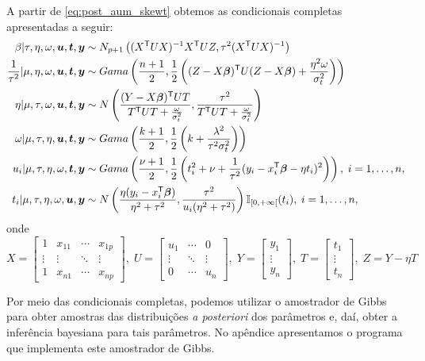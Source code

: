 A partir de \eqref{eq:post_aum_skewt} obtemos as condicionais completas apresentadas a seguir:
\begin{align}
\beta|\tau,\eta,\omega,{\boldsymbol{u}},{\boldsymbol{t}},{\boldsymbol{y}} & \sim N_{p+1}\left((X^{\mathsf{T}} UX)^{-1}X^{\mathsf{T}} UZ,\tau^2(X^{\mathsf{T}} UX)^{-1}\right) \notag \\
\frac{1}{\tau^2}|\mu,\eta,\omega,{\boldsymbol{u}},{\boldsymbol{t}},{\boldsymbol{y}} & \sim Gama\left(\frac{n+1}{2},\frac{1}{2}\left((Z-X{\boldsymbol{\beta}})^{\mathsf{T}} U(Z-X{\boldsymbol{\beta}})+\frac{\eta^2\omega}{\sigma_t^2}\right)\right) \notag \\
\eta|\mu,\tau,\omega,{\boldsymbol{u}},{\boldsymbol{t}},{\boldsymbol{y}} & \sim N\left(\frac{(Y-X{\boldsymbol{\beta}})^{\mathsf{T}} UT}{T^{\mathsf{T}} UT+\tfrac{\omega}{\sigma_t^2}},\frac{\tau^2}{T^{\mathsf{T}} UT+\tfrac{\omega}{\sigma_t^2}}\right) \notag  \\
\omega|\mu,\tau,\eta,{\boldsymbol{u}},{\boldsymbol{t}},{\boldsymbol{y}} & \sim Gama\left(\frac{k+1}{2},\frac{1}{2}\left(k+\frac{\lambda^2}{\tau^2\sigma_t^2}\right)\right) \notag \\
u_i|\mu,\tau,\eta,\omega,{\boldsymbol{t}},{\boldsymbol{y}} & \sim Gama\left(\frac{\nu+1}{2},\frac{1}{2}\left(t_i^2+\nu+\frac{1}{\tau^2}(y_i-x_i^{\mathsf{T}}{\boldsymbol{\beta}}-\eta t_i)^2\right)\right), \;i=1,\ldots,n \notag ,\\
t_i|\mu,\tau,\eta,\omega,{\boldsymbol{u}},{\boldsymbol{y}} & \sim N\left(\frac{\eta(y_i-x_i^{\mathsf{T}}{\boldsymbol{\beta}})}{\eta^2+\tau^2},\frac{\tau^2}{u_i(\eta^2+\tau^2)}\right)\mathbb{I}_{[0,+\infty[}(t_i),\; i=1,\ldots,n,
\end{align}
onde
\begin{equation}
X=\begin{bmatrix}
1 & x_{11} & \cdots & x_{1p} \\
\vdots & \vdots & \ddots & \vdots \\
1 & x_{n1} & \cdots & x_{np}
\end{bmatrix},\;
U=\begin{bmatrix}
u_1 & \cdots & 0 \\
\vdots & \ddots & \vdots \\
0 & \cdots & u_n
\end{bmatrix},\;
Y=\begin{bmatrix}
y_1 \\
\vdots\\
y_n
\end{bmatrix},\;
T=\begin{bmatrix}
t_1 \\
\vdots\\
t_n
\end{bmatrix},\;
Z=Y-\eta T
\end{equation}

Por meio das condicionais completas, podemos utilizar o amostrador de Gibbs para obter amostras das distribuições \textit{a posteriori} dos parâmetros e, daí, obter a inferência bayesiana para tais parâmetros. No apêndice apresentamos o programa que implementa este amostrador de Gibbs.


